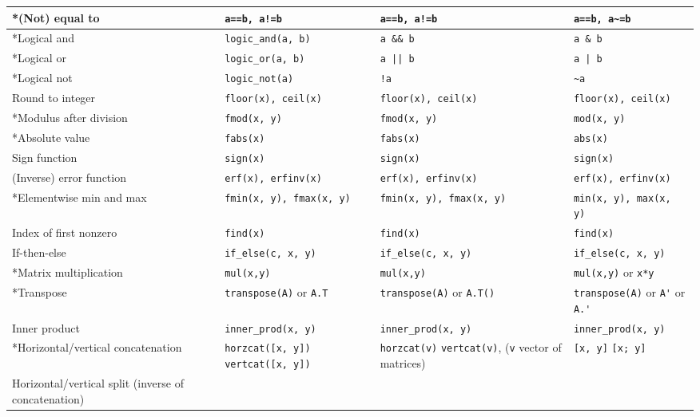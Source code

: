 \documentclass[a4paper,12pt]{book}
\begin{document}
\begin{center}
\begin{tabular}{| p{3.5cm} | p{3.5cm} | p{3.5cm} | p{3.5cm} | }
    *(Not) equal to & \verb|a==b, a!=b| & \verb|a==b, a!=b| & \verb|a==b, a~=b| \\ \hline
    *Logical and & \verb|logic_and(a, b)| &\verb|a && b| &  \verb|a & b| \\ \hline
    *Logical or  & \verb|logic_or(a, b)| & \verb=a || b= & \verb=a | b= \\ \hline
    *Logical not & \verb|logic_not(a)| & \verb|!a| & \verb|~a| \\ \hline
    Round to integer
    & \verb|floor(x), ceil(x)| & \verb|floor(x), ceil(x)| & \verb|floor(x), ceil(x)| \\ \hline
    *Modulus after division
    & \verb|fmod(x, y)| & \verb|fmod(x, y)| & \verb|mod(x, y)| \\ \hline
    *Absolute value
    & \verb|fabs(x)| & \verb|fabs(x)| & \verb|abs(x)| \\ \hline
    Sign function
    & \verb|sign(x)| & \verb|sign(x)| & \verb|sign(x)| \\ \hline
    (Inverse) error function
    & \verb|erf(x), erfinv(x)| & \verb|erf(x), erfinv(x)| & \verb|erf(x), erfinv(x)| \\ \hline
    *Elementwise min and max
    & \verb|fmin(x, y), fmax(x, y)| & \verb|fmin(x, y), fmax(x, y)| & \verb|min(x, y), max(x, y)| \\ \hline
    Index of first nonzero
    & \verb|find(x)| & \verb|find(x)| & \verb|find(x)| \\ \hline
    If-then-else
    & \verb|if_else(c, x, y)| & \verb|if_else(c, x, y)| & \verb|if_else(c, x, y)| \\ \hline
    *Matrix multiplication
    & \verb|mul(x,y)| & \verb|mul(x,y)| & \verb|mul(x,y)| or \verb|x*y| \\ \hline
    *Transpose
    & \verb|transpose(A)| or \verb|A.T| & \verb|transpose(A)| or \verb|A.T()|& \verb|transpose(A)| or \verb|A'| or \verb|A.'| \\ \hline
    Inner product
    & \verb|inner_prod(x, y)| & \verb|inner_prod(x, y)| & \verb|inner_prod(x, y)| \\ \hline
    *Horizontal/vertical concatenation
    & \verb|horzcat([x, y])| \linebreak \verb|vertcat([x, y])|
    & \verb|horzcat(v)| \verb|vertcat(v)|, \linebreak (\verb|v| vector of matrices)
    & \verb|[x, y]| \linebreak \verb|[x; y]| \\ \hline
    Horizontal/vertical split (inverse of concatenation)

\end{tabular}
\end{center}
\end{document}
